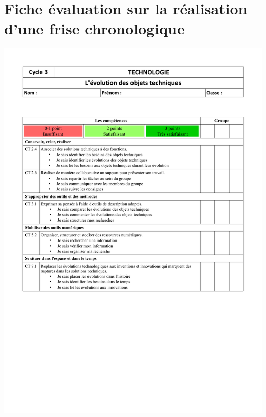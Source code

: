 \section{Fiche évaluation sur la réalisation d'une frise chronologique}\label{annexe:evaluation_frise}
\includegraphics[scale=0.6]{./ressources/TP_evolution_objet_technique_4e.pdf} 

